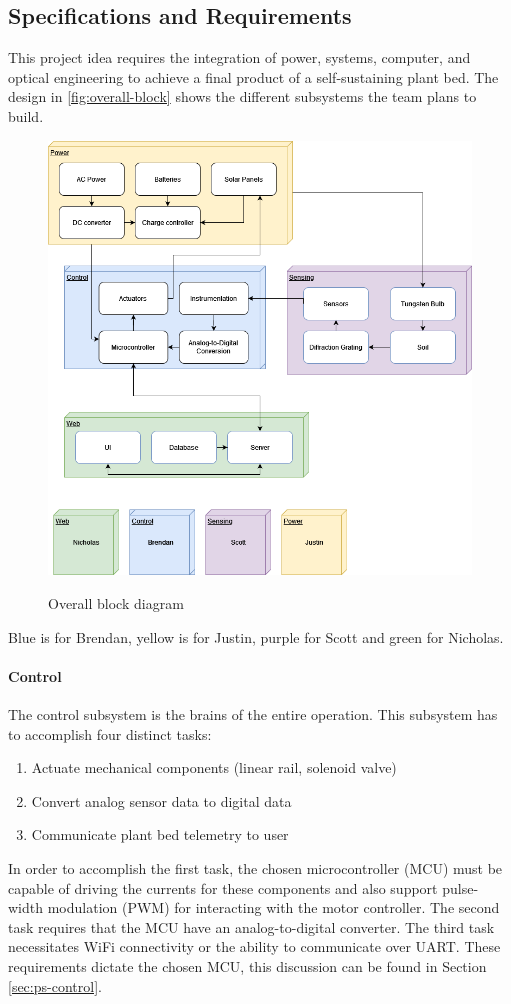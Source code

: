 \subsection{Specifications and Requirements}\label{sec:specs-and-reqs}
This project idea requires the integration of power, systems, computer, and optical engineering to achieve a final product of a self-sustaining plant bed. The design in \autoref{fig:overall-block} shows the different subsystems the team plans to build.
\begin{figure}[H]
    \caption{Overall block diagram}
    \centering
    \includegraphics[width=\textwidth]{images/Overall Block Diagram.png}
    \label{fig:overall-block}
\end{figure}
Blue is for Brendan, yellow is for Justin, purple for Scott and green for Nicholas.
\paragraph{Control}
The control subsystem is the brains of the entire operation. This subsystem has to accomplish four distinct tasks:
\begin{enumerate}
    \item Actuate mechanical components (linear rail, solenoid valve)
    \item Convert analog sensor data to digital data
    \item Communicate plant bed telemetry to user
\end{enumerate}
In order to accomplish the first task, the chosen microcontroller (MCU) must be capable of driving the currents for these components and also support pulse-width modulation (PWM) for interacting with the motor controller. The second task requires that the MCU have an analog-to-digital converter. The third  task necessitates WiFi connectivity or the ability to communicate over UART. These requirements dictate the chosen MCU, this discussion can be found in Section \ref{sec:ps-control}.
